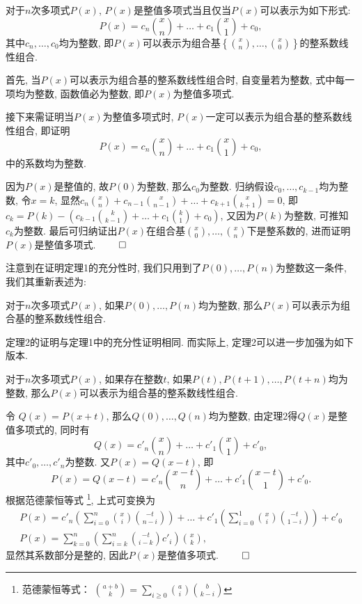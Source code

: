 \documentclass[11pt]{article}%
\newtheorem{theorem}{{\hskip 1.7em \bf 定理}}
\renewenvironment{proof}{{\noindent\hskip 2em \bf 证明 \quad}}{\hfill$\qed$\par\vspace{1em}}
\begin{document}
    \begin{theorem}
        对于$n$次多项式$P(x)$, $P(x)$是整值多项式当且仅当$P(x)$可以表示为如下形式:
        \[
            P(x)=c_n\binom{x}{n}+\ldots+c_1\binom{x}{1}+c_0,
        \]
        其中$c_n,\ldots,c_0$均为整数, 即$P(x)$可以表示为组合基$\left\{\binom{x}{n},\ldots,\binom{x}{0}\right\}$的整系数线性组合.
    \end{theorem}
    \begin{proof}
        首先, 当$P(x)$可以表示为组合基的整系数线性组合时, 自变量若为整数, 式中每一项均为整数, 函数值必为整数, 即$P(x)$为整值多项式.

        接下来需证明当$P(x)$为整值多项式时, $P(x)$一定可以表示为组合基的整系数线性组合, 即证明\[
            P(x)=c_n\binom{x}{n}+\ldots+c_1\binom{x}{1}+c_0,
        \]中的系数均为整数.

        因为$P(x)$是整值的, 故$P(0)$为整数, 那么$c_0$为整数. 归纳假设$c_0,\ldots,c_{k-1}$均为整数, 令$x=k$, 显然$c_n\binom{x}{n}+c_{n-1}\binom{x}{n-1}+\ldots+c_{k+1}\binom{x}{k+1} = 0$, 即$c_k=P(k)-(c_{k-1}\binom{k}{k-1}+\ldots+c_1\binom{k}{1}+c_0)$, 又因为$P(k)$为整数, 可推知$c_k$为整数. 最后可归纳证出$P(x)$在组合基$\binom{x}{0},\ldots,\binom{x}{n}$下是整系数的, 进而证明$P(x)$是整值多项式.
    \end{proof}

    注意到在证明定理1的充分性时, 我们只用到了$P(0),\ldots,P(n)$为整数这一条件, 我们其重新表述为:
    \begin{theorem}
        对于$n$次多项式$P(x)$, 如果$P(0),\dots,P(n)$均为整数, 那么$P(x)$可以表示为组合基的整系数线性组合.
    \end{theorem}

    定理2的证明与定理1中的充分性证明相同. 而实际上, 定理2可以进一步加强为如下版本.
    \begin{theorem}
        对于$n$次多项式$P(x)$, 如果存在整数$t$, 如果$P(t),P(t+1),\dots,P(t+n)$均为整数, 那么$P(x)$可以表示为组合基的整系数线性组合.
    \end{theorem}

    \begin{proof}
        令 $Q(x)=P(x+t)$, 那么$Q(0),\ldots,Q(n)$均为整数, 由定理2得$Q(x)$是整值多项式的, 同时有 \[
            Q(x)=c'_n\binom{x}{n}+\dots+c'_1\binom{x}{1}+c'_0,
        \] 其中$c'_0,\ldots,c'_n$为整数. 又$P(x)=Q(x-t)$, 即
        \[
            P(x)=Q(x-t)=c'_n\binom{x-t}{n}+\dots+c'_1\binom{x-t}{1}+c'_0.
        \]
        根据范德蒙恒等式
        \footnote{范德蒙恒等式：
            $\binom{a+b}{k}=\sum_{i\geq 0}\binom{a}{i}\binom{b}{k-i}$
        }, 上式可变换为
        \begin{gather*}
            P(x)=c'_n\left(\sum_{i=0}^n\binom{x}{i}\binom{-t}{n-i}\right)+\dots+c'_1\left(\sum_{i=0}^1\binom{x}{i}\binom{-t}{1-i}\right)+c'_0\\
            P(x)=\sum_{k=0}^n\left(\sum_{i=k}^n\binom{-t}{i-k}c'_i\right)\binom{x}{k},
        \end{gather*}
        显然其系数部分是整的, 因此$P(x)$是整值多项式.
    \end{proof}
\end{document}
